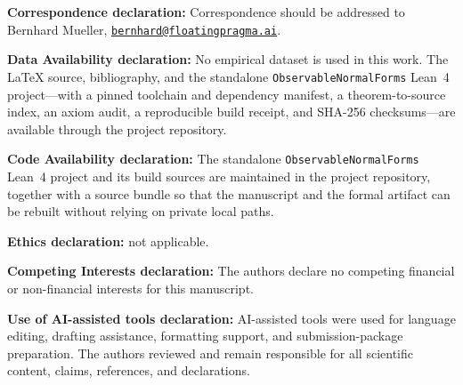 \documentclass[11pt]{article}
\theoremstyle{definition}
\theoremstyle{remark}
\numberwithin{equation}{section}
\begin{document}
\noindent\textbf{Correspondence declaration:} Correspondence should be addressed to Bernhard
Mueller, \href{mailto:bernhard@floatingpragma.ai}{\nolinkurl{bernhard@floatingpragma.ai}}.

\noindent\textbf{Data Availability declaration:} No empirical dataset is used in this work. The
LaTeX source, bibliography, and the standalone \texttt{ObservableNormalForms} Lean~4 project---with
a pinned toolchain and dependency manifest, a theorem-to-source index, an axiom audit, a
reproducible build receipt, and SHA-256 checksums---are available through the project repository.

\noindent\textbf{Code Availability declaration:} The standalone \texttt{ObservableNormalForms}
Lean~4 project and its build sources are maintained in the project repository, together with a
source bundle so that the manuscript and the formal artifact can be rebuilt without relying on
private local paths.

\noindent\textbf{Ethics declaration:} not applicable.

\noindent\textbf{Competing Interests declaration:} The authors declare no competing financial or
non-financial interests for this manuscript.

\noindent\textbf{Use of AI-assisted tools declaration:} AI-assisted tools were used for language
editing, drafting assistance, formatting support, and submission-package preparation. The authors
reviewed and remain responsible for all scientific content, claims, references, and declarations.



\end{document}
